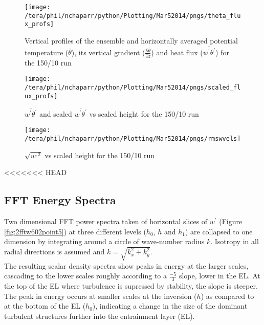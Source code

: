 \begin{figure}[htbp]
    \centering
    \texttt{[image: /tera/phil/nchaparr/python/Plotting/Mar52014/pngs/theta\_flux\_profs]}
    \caption{Vertical profiles of the ensemble and horizontally averaged potential temperature ($\overline{\theta}$), its vertical gradient ($\frac{\partial \overline{\theta}}{\partial z}$)  
     and heat flux ($\overline{w^{'}\theta^{'}}$) for the 150/10 run}
    \label{fig:tempgradfluxprofs15010}   %
\end{figure}

\begin{figure}[htbp]
    \centering
    \texttt{[image: /tera/phil/nchaparr/python/Plotting/Mar52014/pngs/scaled\_flux\_profs]}
    \caption{$\overline{w^{'}\theta^{'}}$ and scaled $\overline{w^{'}\theta^{'}}$  vs scaled height for the 150/10 run}
    \label{fig:scaledfluxprofs15010}   %
\end{figure}

\begin{figure}[htbp]
    \centering
    \texttt{[image: /tera/phil/nchaparr/python/Plotting/Mar52014/pngs/rmswvels]}
    \caption{$\sqrt{w^{,2}}$ vs scaled height for the 150/10 run}
    \label{fig:rmswvelprofs15010}   %
\end{figure}

\clearpage
<<<<<<< HEAD
\subsection{FFT Energy Spectra}
\FloatBarrier

Two dimensional \acs{FFT} power spectra taken of horizontal slices of $w^{'}$ 
(Figure \ref{fig:2fftw602point5}) at three different levels ($h_{0}$, $h$ and $h_{1}$) are collapsed to 
one dimension by integrating around a circle of wave-number radius $k$.  Isotropy in all radial 
directions is assumed and $k = \sqrt{k_{x}^{2} + k_{y}^{2}}$.  \\

The resulting scalar density spectra show peaks in  energy at the larger scales, cascading to the lower 
scales roughly according to a $\frac{-5}{3}$ slope, lower in the \acs{EL}.  At the top of the \acs{EL} 
where turbulence is supressed by stability, the slope is steeper.  The peak in energy occurs at smaller 
scales at the inversion ($h$) as compared to at the bottom of the \acs{EL} ($h_{0}$), indicating a 
change in the size of the dominant turbulent structures further into the entrainment layer (\acs{EL}).\\

